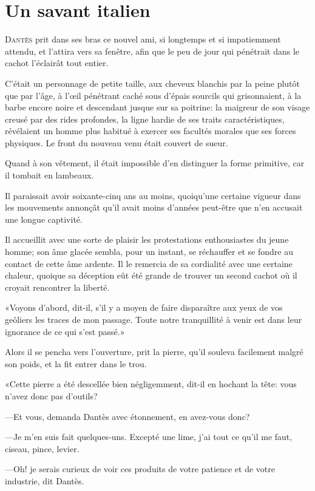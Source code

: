 \chapter{Un savant italien}

\lettrine{D}{antès} prit dans ses bras ce nouvel ami, si longtemps et si impatiemment attendu, et l'attira vers sa fenêtre, afin que le peu de jour qui pénétrait dans le cachot l'éclairât tout entier.

\zz
C'était un personnage de petite taille, aux cheveux blanchis par la peine plutôt que par l'âge, à l'œil pénétrant caché sous d'épais sourcils qui grisonnaient, à la barbe encore noire et descendant jusque sur sa poitrine: la maigreur de son visage creusé par des rides profondes, la ligne hardie de ses traits caractéristiques, révélaient un homme plus habitué à exercer ses facultés morales que ses forces physiques. Le front du nouveau venu était couvert de sueur.

Quand à son vêtement, il était impossible d'en distinguer la forme primitive, car il tombait en lambeaux.

Il paraissait avoir soixante-cinq ans au moins, quoiqu'une certaine vigueur dans les mouvements annonçât qu'il avait moins d'années peut-être que n'en accusait une longue captivité.

Il accueillit avec une sorte de plaisir les protestations enthousiastes du jeune homme; son âme glacée sembla, pour un instant, se réchauffer et se fondre au contact de cette âme ardente. Il le remercia de sa cordialité avec une certaine chaleur, quoique sa déception eût été grande de trouver un second cachot où il croyait rencontrer la liberté.

«Voyons d'abord, dit-il, s'il y a moyen de faire disparaître aux yeux de vos geôliers les traces de mon passage. Toute notre tranquillité à venir est dans leur ignorance de ce qui s'est passé.»

Alors il se pencha vers l'ouverture, prit la pierre, qu'il souleva facilement malgré son poids, et la fit entrer dans le trou.

«Cette pierre a été descellée bien négligemment, dit-il en hochant la tête: vous n'avez donc pas d'outils?

—Et vous, demanda Dantès avec étonnement, en avez-vous donc?

—Je m'en suis fait quelques-uns. Excepté une lime, j'ai tout ce qu'il me faut, ciseau, pince, levier.

—Oh! je serais curieux de voir ces produits de votre patience et de votre industrie, dit Dantès.

